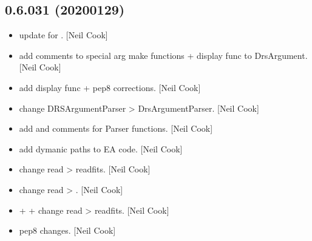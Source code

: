 \documentclass[a4paper,10pt,english]{report}
\begin{document}
\subsection{0.6.031 (2020\sphinxhyphen{}01\sphinxhyphen{}29)}
\label{\detokenize{misc/changelog:id6}}\begin{itemize}
\item {} 
 \sphinxhyphen{} update  for . {[}Neil
Cook{]}

\item {} 
 \sphinxhyphen{} add comments to special arg make functions
+ display func to DrsArgument. {[}Neil Cook{]}

\item {} 
 \sphinxhyphen{} add display func + pep8 corrections. {[}Neil
Cook{]}

\item {} 
 \sphinxhyphen{} change DRSArgumentParser \textendash{}\textgreater{}
DrsArgumentParser. {[}Neil Cook{]}

\item {} 
 \sphinxhyphen{} add  and comments for Parser
functions. {[}Neil Cook{]}

\item {} 
 \sphinxhyphen{} add dymanic paths to EA code.
{[}Neil Cook{]}

\item {} 
 \sphinxhyphen{} change read \textendash{}\textgreater{} readfits. {[}Neil
Cook{]}

\item {} 
 \sphinxhyphen{} change read \textendash{}\textgreater{} . {[}Neil Cook{]}

\item {} 
 +  +  \sphinxhyphen{} change read \textendash{}\textgreater{}
readfits. {[}Neil Cook{]}

\item {} 
 \sphinxhyphen{} pep8 changes. {[}Neil Cook{]}


\end{itemize}
\end{document}
